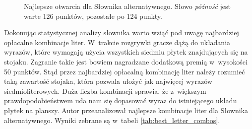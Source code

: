 \documentclass[a4paper,twocolumn,12pt]{article}
\theoremstyle{definition}
\begin{document}
\begin{figure}[ht!]
\begin{center}
	\caption{Najlepsze otwarcia dla Słownika alternatywnego. Słowo \emph{późność} jest warte 126 punktów, pozostałe po 124 punkty.}
	\label{fig:best_openings}
	\end{center}
\end{figure}

Dokonując statystycznej analizy słownika warto wziąć pod uwagę najbardziej opłacalne kombinacje liter. W~trakcie rozgrywki gracze dążą do układania wyrazów, które wymagają użycia wszystkich siedmiu płytek znajdujących się na stojaku. Zagranie takie jest bowiem nagradzane dodatkową premią w~wysokości 50 punktów. Stąd przez najbardziej opłacalną kombinację liter należy rozumieć taką zawartość stojaka, która pozwala ułożyć jak najwięcej wyrazów siedmioliterowych. Duża liczba kombinacji sprawia, że z~większym prawdopodobieństwem uda nam się dopasować wyraz do istniejącego układu płytek na planszy. Autor przeanalizował najlepsze kombinacje liter dla Słownika alternatywnego. Wyniki zebrane są w~tabeli \ref{tab:best_letter_combos}.
\end{document}
